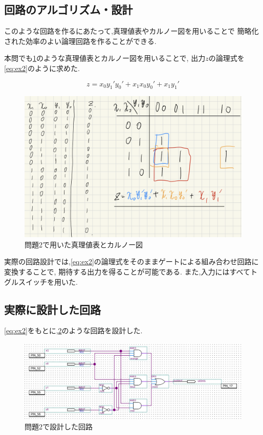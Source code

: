 \documentclass[autodetect-engine, dvi=dvipdfmx, 10pt, a4paper, ja=standard]{bxjsarticle}
\begin{document}
\subsection{回路のアルゴリズム・設計}

このような回路を作るにあたって,真理値表やカルノー図を用いることで
簡略化された効率のよい論理回路を作ることができる.

本問でも\ref{fig:ex2-karnaugh}のような真理値表とカルノー図を用いることで,
出力$z$の論理式を\ref{eq:ex2}のように求めた.

\begin{equation}
	\label{eq:ex2}
	z = x_0 y_1' y_0' + x_1 x_0 y_0' + x_1 y_1'
\end{equation}



\begin{figure}[htbp]
	\centering
	\includegraphics[width=0.8\columnwidth]{asset/ex2_fig.png}
	\caption{問題2で用いた真理値表とカルノー図}
	\label{fig:ex2-karnaugh}
\end{figure}


実際の回路設計では,\ref{eq:ex2}の論理式をそのままゲートによる組み合わせ回路に変換することで,
期待する出力を得ることが可能である.
また,入力にはすべてトグルスイッチを用いた.

\subsection{実際に設計した回路}

\ref{eq:ex2}をもとに,\ref{fig:ex2}のような回路を設計した.

\begin{figure}[htbp]
	\centering
	\includegraphics[width=\columnwidth]{asset/ex2_trim.jpg}
	\caption{問題2で設計した回路}
	\label{fig:ex2}
\end{figure}
\end{document}
